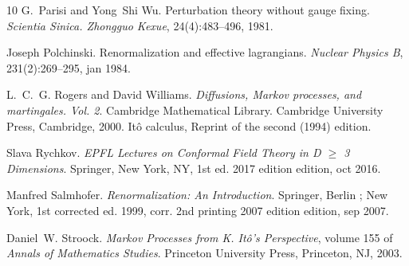 \documentclass[reprint,aps]{revtex4-2}
\newcommand{\tmtextit}[1]{\textit{{{#1}}}}
\begin{document}
\begin{thebibliography}{10}
  G.~Parisi and Yong~Shi Wu.
  {\newblock}Perturbation theory without gauge fixing.
  {\newblock}\tmtextit{Scientia Sinica. Zhongguo Kexue}, 24(4):483--496, 1981.
  
  Joseph
  Polchinski. {\newblock}Renormalization and effective lagrangians.
  {\newblock}\tmtextit{Nuclear Physics B}, 231(2):269--295, jan 1984.
  
  L.~C.~G. Rogers and David Williams.
  {\newblock}\tmtextit{Diffusions, Markov processes, and martingales. Vol. 2}.
  {\newblock}Cambridge Mathematical Library. Cambridge University Press,
  Cambridge, 2000. {\newblock}It{\^o} calculus, Reprint of the second (1994)
  edition.
  
  Slava Rychkov.
  {\newblock}\tmtextit{EPFL Lectures on Conformal Field Theory in D $\geq$ 3
  Dimensions}. {\newblock}Springer, New York, NY, 1st ed. 2017 edition
  edition, oct 2016.
  
  Manfred Salmhofer.
  {\newblock}\tmtextit{Renormalization: An Introduction}. {\newblock}Springer,
  Berlin ; New York, 1st corrected ed. 1999, corr. 2nd printing 2007 edition
  edition, sep 2007.
  
  Daniel~W. Stroock.
  {\newblock}\tmtextit{Markov Processes from K. It{\^o}'s Perspective}, volume
  155 of \tmtextit{Annals of Mathematics Studies}. {\newblock}Princeton
  University Press, Princeton, NJ, 2003.
\end{thebibliography}
\end{document}
